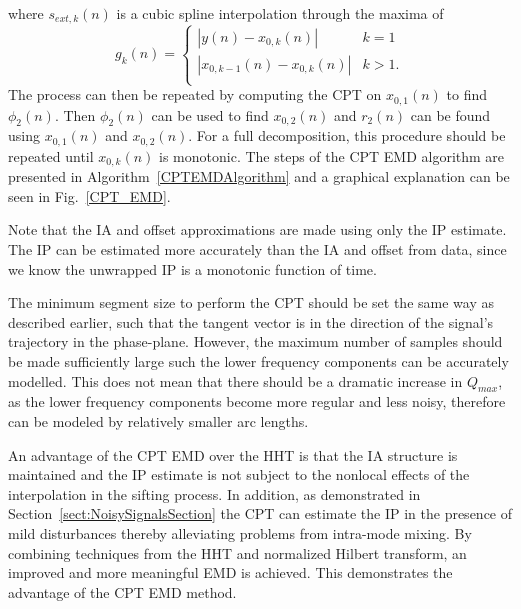 \documentclass[journal,11pt,a4paper,onecolumn,draftcls]{IEEEtran}
\begin{document}
where $s_{ext,k}(n)$ is a cubic spline interpolation through the maxima of
\begin{equation}
    g_k(n) = \left\{ \begin{array}{*{20}{c}}
    {|y(n) - x_{0,k}(n)|} & {k=1} \\
    {|x_{0,k-1}(n) - x_{0,k}(n)|} & {k>1}. \\
    \end{array} \right.
\end{equation}
The process can then be repeated by computing the CPT on $x_{0,1}(n)$ to find $\phi_2(n)$. Then $\phi_2(n)$ can be used to  find $x_{0,2}(n)$ and $r_2(n)$ can be found using $x_{0,1}(n)$ and $x_{0,2}(n)$. For a full decomposition, this procedure should be repeated until $x_{0,k}(n)$ is monotonic. The steps of the CPT EMD algorithm are presented in Algorithm~\ref{CPTEMDAlgorithm} and a graphical explanation can be seen in Fig.~\ref{CPT_EMD}.

Note that the IA and offset approximations are made using only the IP estimate. The IP can be estimated more accurately than the IA and offset from data, since we know the unwrapped IP is a monotonic function of time.

The minimum segment size to perform the CPT should be set the same way as described earlier, such that the tangent vector is in the direction of the signal's trajectory in the phase-plane. However, the maximum number of samples should be made sufficiently large such the lower frequency components can be accurately modelled. This does not mean that there should be a dramatic increase in $Q_{max}$, as the lower frequency components become more regular and less noisy, therefore can be modeled by relatively smaller arc lengths.

An advantage of the CPT EMD over the HHT is that the IA structure is maintained and the IP estimate is not subject to the nonlocal effects of the interpolation in the sifting process. In addition, as demonstrated in Section~\ref{sect:NoisySignalsSection} the CPT can estimate the IP in the presence of mild disturbances thereby alleviating problems from intra-mode mixing. By combining techniques from the HHT and normalized Hilbert transform, an improved and more meaningful EMD is achieved. This demonstrates the advantage of the CPT EMD method. %
\end{document}
